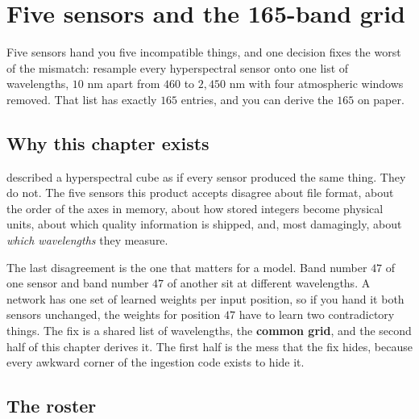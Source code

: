 \chapter{Five sensors and the 165-band grid}\label{ch:sensors}

\begin{onething}
Five sensors hand you five incompatible things, and one decision fixes the worst of the
mismatch: resample every hyperspectral sensor onto one list of wavelengths, $10$ nm apart from
$460$ to $2{,}450$ nm with four atmospheric windows removed. That list has exactly $165$ entries,
and you can derive the $165$ on paper.
\end{onething}

\section{Why this chapter exists}\label{sec:sensors:motivation}

 described a hyperspectral cube as if every sensor produced the same thing. They
do not. The five sensors this product accepts disagree about file format, about the order of the
axes in memory, about how stored integers become physical units, about which quality
information is shipped, and, most damagingly, about \emph{which wavelengths} they measure.

The last disagreement is the one that matters for a model. Band number $47$ of one sensor and band
number $47$ of another sit at different wavelengths. A network has one set of learned weights per
input position, so if you hand it both sensors unchanged, the weights for position $47$ have to
learn two contradictory things. The fix is a shared list of wavelengths, the
\textbf{common grid}, and the second half of this chapter derives it. The first half is the mess
that the fix hides, because every awkward corner of the ingestion code exists to hide it.

\section{The roster}\label{sec:sensors:roster}

